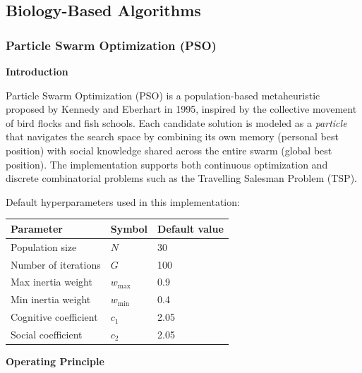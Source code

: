 \subsection{Biology-Based Algorithms}

\subsubsection{Particle Swarm Optimization (PSO)}

\textbf{Introduction}

Particle Swarm Optimization (PSO) is a population-based metaheuristic proposed by Kennedy and
Eberhart in 1995, inspired by the collective movement of bird flocks and fish schools. Each
candidate solution is modeled as a \textit{particle} that navigates the search space by
combining its own memory (personal best position) with social knowledge shared across the
entire swarm (global best position). The implementation supports both continuous optimization
and discrete combinatorial problems such as the Travelling Salesman Problem (TSP).

Default hyperparameters used in this implementation:
\begin{center}
\begin{tabular}{lll}
\hline
\textbf{Parameter} & \textbf{Symbol} & \textbf{Default value} \\
\hline
Population size          & $N$          & 30   \\
Number of iterations     & $G$          & 100  \\
Max inertia weight       & $w_{\max}$   & 0.9  \\
Min inertia weight       & $w_{\min}$   & 0.4  \\
Cognitive coefficient    & $c_1$        & 2.05 \\
Social coefficient       & $c_2$        & 2.05 \\
\hline
\end{tabular}
\end{center}

\textbf{Operating Principle}

